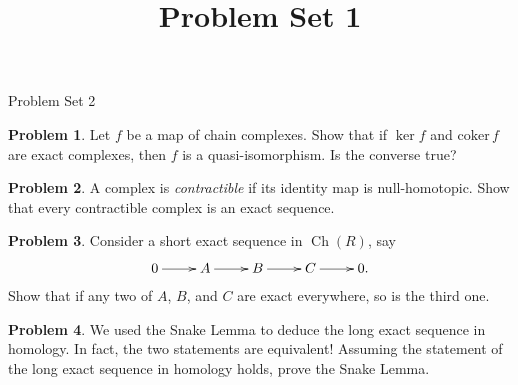 \documentclass[11pt]{article}
\title{}
\date{\vspace{-0.5in}}
\title{Problem Set 1}
\DeclareMathOperator{\Ch}{Ch}
\theoremstyle{definition}
\newtheorem{problem}{Problem}
\begin{document}
\thispagestyle{fancy}
\pagestyle{fancy}


\begin{center}
	{\LARGE Problem Set 2}
\end{center}



\begin{problem}
	Let $f$ be a map of chain complexes. Show that if $\ker f$ and $\textrm{coker}\, f$ are exact complexes, then $f$ is a quasi-isomorphism. Is the converse true?
\end{problem}


\begin{problem}
	A complex is \emph{contractible} if its identity map is null-homotopic. Show that every contractible complex is an exact sequence.
\end{problem}


\begin{problem}
	Consider a short exact sequence in $\Ch(R)$, say
	$$\xymatrix{0 \ar[r] & A \ar[r] & B \ar[r] & C \ar[r] & 0.}$$
	Show that if any two of $A$, $B$, and $C$ are exact everywhere, so is the third one.
\end{problem}


\begin{problem}
	We used the Snake Lemma to deduce the long exact sequence in homology. In fact, the two statements are equivalent! Assuming the statement of the long exact sequence in homology holds, prove the Snake Lemma. 
\end{problem}


\

\noindent
{} 
\end{document}
